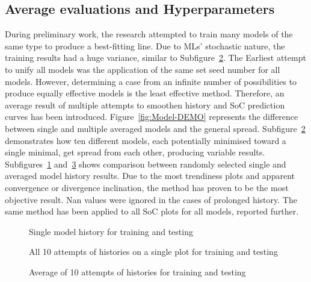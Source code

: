 \subsection{Average evaluations and Hyperparameters}
%
During preliminary work, the research attempted to train many models of the same type to produce a best-fitting line.
Due to MLs' stochastic nature, the training results had a huge variance, similar to Subfigure~\ref{subfig:Model-DEMO-10}.
The Earliest attempt to unify all models was the application of the same set seed number for all models.
However, determining a case from an infinite number of possibilities to produce equally effective models is the least effective method.
Therefore, an average result of multiple attempts to smoothen history and SoC prediction curves has been introduced.
Figure~\ref{fig:Model-DEMO} represents the difference between single and multiple averaged models and the general spread.
Subfigure~\ref{subfig:Model-DEMO-10} demonstrates how ten different models, each potentially minimised toward a single minimal, get spread from each other, producing variable results.
Subfigures~\ref{subfig:Model-DEMO-1} and~\ref{subfig:Model-DEMO-avr} shows comparison between randomly selected single  and averaged model history results.
Due to the most trendiness plots and apparent convergence or divergence inclination, the method has proven to be the most objective result.
Nan values were ignored in the cases of prolonged history.
The same method has been applied to all SoC plots for all models, reported further.
\begin{figure*}[htbp]
  \centering
  \begin{subfigure}[b]{0.325\textwidth}
      \centering
      
      \caption{Single model history for training and testing}
      \label{subfig:Model-DEMO-1}
  \end{subfigure}
  \hfill
  \begin{subfigure}[b]{0.325\textwidth}
      \centering
      
      \caption{All 10 attempts of histories on a single plot for training and testing}
      \label{subfig:Model-DEMO-10}
  \end{subfigure}
  \hfill
  \begin{subfigure}[b]{0.325\textwidth}
      \centering
      
      \caption{Average of 10 attempts of histories for training and testing}
      \label{subfig:Model-DEMO-avr}
  \end{subfigure}
  \caption{Results averaging demonstration}
  \label{fig:Model-DEMO}
\end{figure*}

